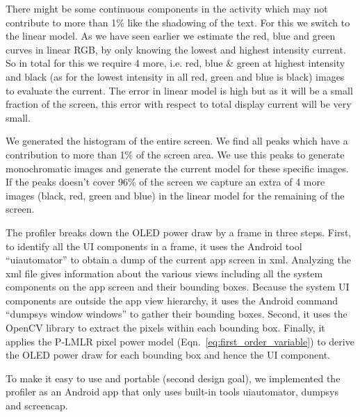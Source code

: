 There might be some continuous components in the activity which may not contribute
to more than 1\% like the shadowing of the text. For this we switch to the linear model.
As we have seen earlier we estimate the red, blue and green curves in linear RGB,
by only knowing the lowest and highest intensity current. So in total for this we
require 4 more, i.e. red, blue \& green at highest intensity and black
(as for the lowest intensity in all red, green and blue is black) images to evaluate the current.
The error in linear model is high but as it will be a small fraction of the screen,
this error with respect to total display current will be very small.
\fi

We generated the histogram of the entire screen. We find all peaks
which have a contribution to more than 1\% of the screen area.  We use
this peaks to generate monochromatic images and generate the current
model for these specific images.  If the peaks doesn't cover 96\% of
the screen we capture an extra of 4 more images (black, red, green and
blue) in the linear model for the remaining of the screen.
\fi


The \appwithlink profiler breaks down the OLED power draw by a frame in three steps.
First, to identify all the UI
components in a frame, it uses the Android tool ``uiautomator'' to
obtain a dump of the current app screen in xml. {Analyzing the xml
  file gives information about the various views including all the
  system components on the app screen and their bounding boxes.}
Because the system UI components are outside the app view hierarchy,
it uses the Android command ``dumpsys window windows'' to gather their
bounding boxes.  Second, it uses the OpenCV library to extract the
pixels within each bounding box.  Finally, it applies the P-LMLR pixel
power model (Eqn.~\ref{eq:first_order_variable}) to derive the OLED power draw for each bounding box and
hence the UI component.


To make it easy to use and portable (second design goal),
we implemented the \appwithlink profiler as an Android
app that only
uses built-in tools uiautomator,
dumpsys and screencap.

